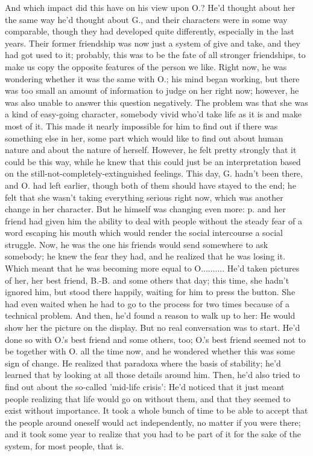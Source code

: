 And which impact did this have on his view upon O.? 
He'd thought about her the same way he'd thought about G., and their characters were in some way comparable, though they had developed quite differently, especially in the last years. Their former friendship was now just a system of give and take, and they had got used to it; probably, this was to be the fate of all stronger friendships, to make us copy the opposite features of the person we like. Right now, he was wondering whether it was the same with O.; his mind began working, but there was too small an amount of information to judge on her right now; however, he was also unable to answer this question negatively. The problem was that she was a kind of easy-going character, somebody vivid who'd take life as it is and make most of it. This made it nearly impossible for him to find out if there was something else in her, some part which would like to find out about human nature and about the nature of herself. However, he felt pretty strongly that it could be this way, while he knew that this could just be an interpretation based on the still-not-completely-extinguished feelings. 
This day, G. hadn't been there, and O. had left earlier, though both of them should have stayed to the end; he felt that she wasn't taking everything serious right now, which was another change in her character. But he himself was changing even more: p. and her friend had given him the ability to deal with people without the steady fear of a word escaping his mouth which would render the social intercourse a social struggle. Now, he was the one his friends would send somewhere to ask somebody; he knew the fear they had, and he realized that he was losing it. Which meant that he was becoming more equal to O..........
He'd taken pictures of her, her best friend, B.-B. and some others that day; this time, she hadn't ignored him, but stood there happily, waiting for him to press the button. She had even waited when he had to go to the process for two times because of a technical problem. And then, he'd found a reason to walk up to her: He would show her the picture on the display. But no real conversation was to start. 
He'd done so with O.'s best friend and some others, too; O.'s best friend seemed not to be together with O. all the time now, and he wondered whether this was some sign of change. 
He realized that paradoxa where the basis of stability; he'd learned that by looking at all those details around him. Then, he'd also tried to find out about the so-called 'mid-life crisis': He'd noticed that it just meant people realizing that life would go on without them, and that they seemed to exist without importance. It took a whole bunch of time to be able to accept that the people around oneself would act independently, no matter if you were there; and it took some year to realize that you had to be part of it for the sake of the system, for most people, that is. 
